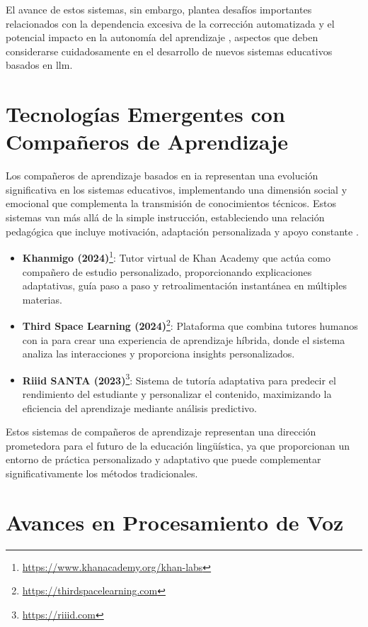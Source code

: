 El avance de estos sistemas, sin embargo, plantea desafíos importantes relacionados con la dependencia excesiva de la corrección automatizada y el potencial impacto en la autonomía del aprendizaje \cite{Rodriguez2023}, aspectos que deben considerarse cuidadosamente en el desarrollo de nuevos sistemas educativos basados en \gls{llm}.


\section{Tecnologías Emergentes con Compañeros de Aprendizaje}
\label{sec:companeros-aprendizaje}

Los compañeros de aprendizaje basados en \gls{ia} representan una evolución significativa en los sistemas educativos, implementando una dimensión social y emocional que complementa la transmisión de conocimientos técnicos. Estos sistemas van más allá de la simple instrucción, estableciendo una relación pedagógica que incluye motivación, adaptación personalizada y apoyo constante \citep{baker2014educational}.

\begin{itemize}
  \item \textbf{Khanmigo (2024)}\footnote{\url{https://www.khanacademy.org/khan-labs}}: Tutor virtual de Khan Academy que actúa como compañero de estudio personalizado, proporcionando explicaciones adaptativas, guía paso a paso y retroalimentación instantánea en múltiples materias.

  \item \textbf{Third Space Learning (2024)}\footnote{\url{https://thirdspacelearning.com}}: Plataforma que combina tutores humanos con \gls{ia} para crear una experiencia de aprendizaje híbrida, donde el sistema analiza las interacciones y proporciona insights personalizados.

  \item \textbf{Riiid SANTA (2023)}\footnote{\url{https://riiid.com}}: Sistema de tutoría adaptativa para predecir el rendimiento del estudiante y personalizar el contenido, maximizando la eficiencia del aprendizaje mediante análisis predictivo.
\end{itemize}

Estos sistemas de compañeros de aprendizaje representan una dirección prometedora para el futuro de la educación lingüística, ya que proporcionan un entorno de práctica personalizado y adaptativo que puede complementar significativamente los métodos tradicionales.

\section{Avances en Procesamiento de Voz}
\label{sec:procesamiento-voz}


